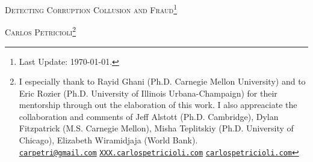 \thispagestyle{plain}
\begin{center}
\scshape \large Detecting Corruption Collusion and Fraud\footnote{ Last Update: \today.}

\bigskip
\scshape Carlos Petricioli\footnote{I especially thank to Rayid Ghani (Ph.D. Carnegie Mellon University) and to Eric Rozier (Ph.D. University of Illinois Urbana-Champaign) for their mentorship through out the elaboration of this work. I also appreaciate the collaboration and comments of Jeff Alstott (Ph.D. Cambridge), Dylan Fitzpatrick (M.S. Carnegie Mellon), Misha Teplitskiy (Ph.D. University of Chicago), Elizabeth Wiramidjaja (World Bank).
\\ \href{mailto:carpetri@gmail.com}{\texttt{carpetri@gmail.com}}  \hfill \href{http://XXX.carlospetricioli.com}{\texttt{XXX.carlospetricioli.com}} \hfill \href{http://carlospetricioli.com}{\texttt{carlospetricioli.com}} }
\normalsize
\end{center}



